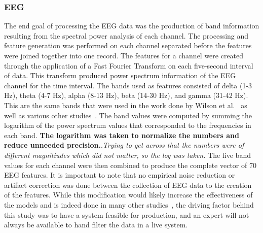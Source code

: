 \documentclass[11pt]{article}
\begin{document}
		\subsubsection{EEG}
		The end goal of processing the EEG data was the production of band information resulting from the spectral power analysis of each channel.  The processing and feature generation was performed on each channel separated before the features were joined together into one record. The features for a channel were created through the application of a Fast Fourier Transform on each five-second interval of data. This transform produced power spectrum information of the EEG channel for the time interval. The bands used as features consisted of delta (1-3 Hz), theta (4-7 Hz), alpha (8-13 Hz), beta (14-30 Hz), and gamma (31-42 Hz). This are the same bands that were used in the work done by Wilson et al.~\cite{Wilson} as well as various other studies~\cite{Estepp_2015, Wilson_2012}. The band values were computed by summing the logarithm of the power spectrum values that corresponded to the frequencies in each band. {\bf The logarithm was taken to normalize the numbers and reduce unneeded precision.}.\emph{Trying to get across that the numbers were of different magnitiudes which did not matter, so the log was taken.} The five band values for each channel were then combined to produce the complete vector of 70 EEG features. It is important to note that no empirical noise reduction or artifact correction was done between the collection of EEG data to the creation of the features. While this modification would likely increase the effectiveness of the models and is indeed done in many other studies~\cite{Estepp_2015,Ting, Smith}, the driving factor behind this study was to have a system feasible for production, and an expert will not always be available to hand filter the data in a live system. 
			
\end{document}
